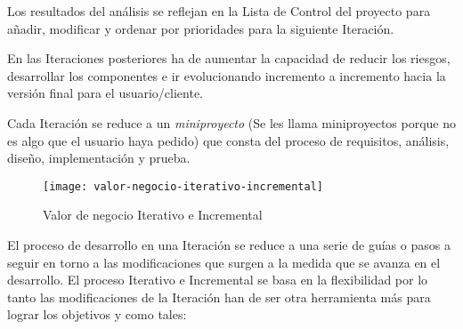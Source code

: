 \par Los resultados del análisis se reflejan en la Lista de Control del proyecto para añadir, modificar y ordenar por prioridades para la siguiente Iteración.

\par En las Iteraciones posteriores ha de aumentar la capacidad de reducir los riesgos, desarrollar los componentes e ir evolucionando incremento a incremento hacia la versión final para el usuario/cliente.

\par Cada Iteración se reduce a un \emph{miniproyecto} (Se les llama miniproyectos porque no es algo que el usuario haya pedido) que consta del proceso de requisitos, análisis, diseño, implementación y prueba.

\begin{figure}[H]
    \centering
    \texttt{[image: valor-negocio-iterativo-incremental]}
    \caption{Valor de negocio Iterativo e Incremental}
    \label{fig:valor-negocio-iterativo-incremental}
\end{figure}

\par El proceso de desarrollo en una Iteración se reduce a una serie de guías o pasos a seguir en torno a las modificaciones que surgen a la medida que se avanza en el desarrollo. El proceso Iterativo e Incremental se basa en la flexibilidad por lo tanto las modificaciones de la Iteración han de ser otra herramienta más para lograr los objetivos y como tales:

